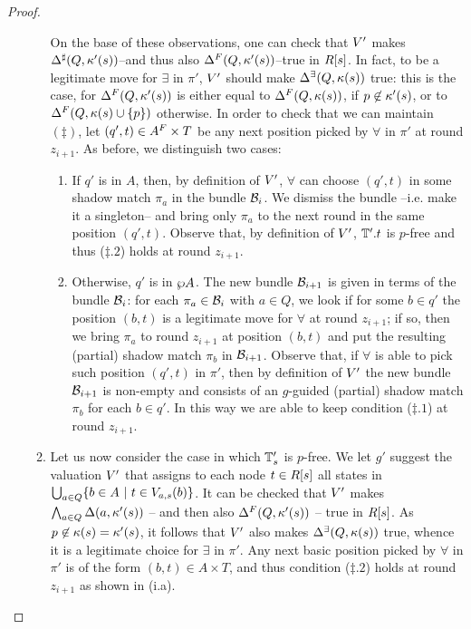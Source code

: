 \begin{proof}
\begin{enumerate}[label = (\Alph*), ref = \Alph*]
\begin{enumerate}[label = (\roman*), ref = \roman*]
       On the base of these observations, one can check that $V'$ makes $\Delta^{\sharp}(Q,\kappa'(s))$--and thus also $\Delta^{F}(Q,\kappa'(s))$--true in $R[s]$. In fact, to be a legitimate move for $\exists$ in $\pi'$, $V'$ should make $\Delta^\exists(Q,\kappa(s))$ true: this is the case, for $\Delta^{F}(Q,\kappa'(s))$ is either equal to $\Delta^{F}(Q,\kappa(s))$, if $p \not\in \kappa'(s)$, or to $\Delta^{F}(Q,\kappa(s)\cup\{p\})$ otherwise. In order to check that we can maintain $(\ddag)$, let $(q',t) \in A^{F} \times T$ be any next position picked by $\forall$ in $\pi'$ at round $z_{i+1}$. As before, we distinguish two cases:
       \begin{enumerate}[label = (\alph*), ref = \alph*]
         \item If $q'$ is in $A$, then, by definition of $V'$, $\forall$ can choose $(q',t)$ in some shadow match $\pi_a$ in the bundle $\mathcal{B}_i$. We dismiss the bundle --i.e. make it a singleton-- and bring only $\pi_a$ to the next round in the same position $(q',t)$. Observe that, by definition of $V'$, $\mathbb{T}'.t$ is $p$-free and thus ($\ddag.2$) holds at round $z_{i+1}$. \label{point:ddag2CardfromMacro}
         \item Otherwise, $q'$ is in $\wp A$. The new bundle $\mathcal{B}_{i+1}$ is given in terms of the bundle $\mathcal{B}_i$: for each $\pi_a \in \mathcal{B}_i$ with $a\in Q$, we look if for some $b \in q'$ the position $(b,t)$ is a legitimate move for $\forall$ at round $z_{i+1}$; if so, then we bring $\pi_a$ to round $z_{i+1}$ at position $(b,t)$ and put the resulting (partial) shadow match $\pi_b$ in $\mathcal{B}_{i+1}$. Observe that, if $\forall$ is able to pick such position $(q',t)$ in $\pi'$, then by definition of $V'$ the new bundle $\mathcal{B}_{i+1}$ is non-empty and consists of an $g$-guided (partial) shadow match $\pi_b$ for each $b \in q'$. In this way we are able to keep condition ($\ddag.1$) at round $z_{i+1}$.
       \end{enumerate}
    \item Let us now consider the case in which $\mathbb{T}'_s$ is $p$-free. We let $g'$ suggest the valuation $V'$ that assigns to each node $t \in R[s]$ all states in $\bigcup_{a \in Q}\{b \in A\ |\ t \in V_{a,s}(b)\}$. It can be checked that $V'$ makes $\bigwedge_{a \in Q} \Delta(a,\kappa'(s))$ -- and then also $\Delta^{F}(Q,\kappa'(s))$ -- true in $R[s]$. As $p \not\in \kappa(s)=\kappa'(s)$, it follows that $V'$ also makes $\Delta^\exists(Q,\kappa(s))$ true, whence it is a legitimate choice for $\exists$ in $\pi'$. Any next basic position picked by $\forall$ in $\pi'$ is of the form $(b,t) \in A \times T$, and thus condition ($\ddag.2$) holds at round $z_{i+1}$ as shown in (i.a). %

\end{enumerate}
\end{enumerate}
\end{proof}
